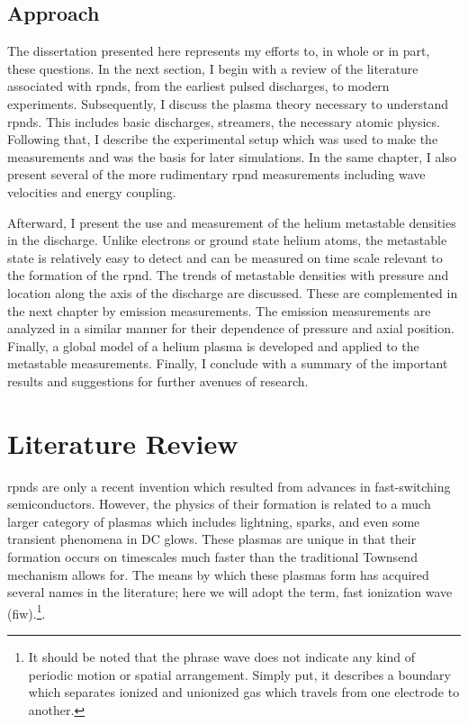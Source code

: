 \subsection{Approach}

The dissertation presented here represents my efforts to, in whole or in part,
these questions. In the next section, I begin with a review of the literature
associated with \acs{rpnd}s, from the earliest pulsed discharges, to modern
experiments. Subsequently, I discuss the plasma theory necessary to understand
\acs{rpnd}s. This includes basic discharges, streamers, the necessary atomic
physics. Following that, I describe the experimental setup which was used to
make the measurements and was the basis for later simulations. In the same
chapter, I also present several of the more rudimentary \acs{rpnd} measurements
including wave velocities and energy coupling.

Afterward, I present the use and measurement of the helium metastable densities
in the discharge. Unlike electrons or ground state helium atoms, the metastable
state is relatively easy to detect and can be measured on time scale relevant to
the formation of the \acs{rpnd}. The trends of metastable densities with
pressure and location along the axis of the discharge are discussed. These are
complemented in the next chapter by emission measurements. The emission
measurements are analyzed in a similar manner for their dependence of pressure
and axial position. Finally, a global model of a helium plasma is developed and
applied to the metastable measurements. Finally, I conclude with a summary of
the important results and suggestions for further avenues of research.

\section{Literature Review}

\acs{rpnd}s are only a recent invention which resulted from advances in
fast-switching semiconductors. However, the physics of their formation is
related to a much larger category of plasmas which includes lightning, sparks,
and even some transient phenomena in DC glows. These plasmas are unique in that
their formation occurs on timescales much faster than the traditional Townsend
mechanism allows for. The means by which these plasmas form has acquired several
names in the literature; here we will adopt the term, fast ionization wave
(\acs{fiw}).\footnote{It should be noted that the phrase wave does not indicate
any kind of periodic motion or spatial arrangement. Simply put, it describes a
boundary which separates ionized and unionized gas which travels from one
electrode to another.}.

